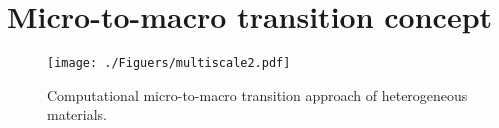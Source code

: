 \documentclass[final,3p,times]{elsarticle}
\begin{document}
\section{Micro-to-macro transition concept}
\label{sec2-CNN}

\begin{comment} %
The aim of this section is to give an overview of the multiscale mechanics of materials. A material point $\bar\Bx$ within the solid $\bar\calB$ at the macro level is considered. In addition to kinematics and balance relations, given by continuum mechanics, the constitutive behavior is needed to solve a boundary value problem in $\bar\calB$. In cases when the material body consists of a heterogeneous microstructure that determines its behavior, a constitutive assumption posed a priori can only provide a coarse estimate of the effective constitutive behavior. The homogenization approach relies on the assumption that the two considered scales are well separated, i.e.\ a typical size on the macroscale is much larger than a typical size of the underlying microstructure, $l_{macro} \gg l_{micro}$ as depicted in Figure~\ref{homo}. At the microscale, the so-called representative volume element $\cal{RVE}$ models the microstructure that corresponds to the macroscopic material point. Under boundary conditions which are determined by the macroscopic state of deformation, a boundary-value-problem is defined on this representative volume element. At this level, both the governing balance relations and the constitutive behavior are known. The goal is to return this constitutive information from a finer scale to the macro level. The $\cal{RVE}$ acts as a statistically representative portion of the heterogeneous microstructure (grains separated by grain boundary, voids, inclusion, crack, and other similar defects), see \citet{nemat-nasser+hori99}. Its size must be chosen such that it is large enough to be representative or rather such that it sufficiently accounts for the character and distribution of heterogeneities. Nevertheless, it should be much smaller than the specimen considered at the macro level to ensure a scale separation on the one hand, and to achieve an increased efficiency on the other hand. If the material or geometric properties of the underlying microstructures vary spatially within a macro specimen, as e.g. in functionally graded materials, the representative volume element can be chosen differently in different macro regions if only a local periodicity is required.  

\end{comment} %
%
\begin{figure} [t]%
	\centering%
	\texttt{[image: ./Figuers/multiscale2.pdf]}
	\caption{Computational micro-to-macro transition approach of heterogeneous materials.}
	\label{homo}%
\end{figure}%
%
%
\end{document}

